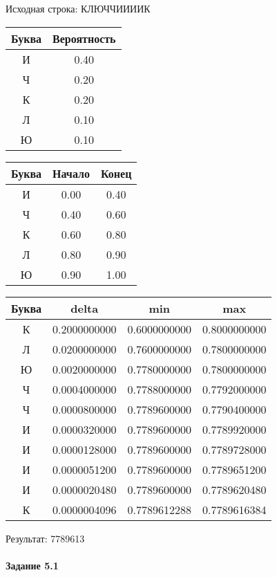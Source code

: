 \documentclass[a4paper, 12pt]{article}
\begin{document}
Исходная строка: КЛЮЧЧИИИИК\
\begin{center}
 \begin{tabular}{ |c|c| } 
  \hline
     Буква & Вероятность \\ \hline
И & 0.40\\\hline
Ч & 0.20\\\hline
К & 0.20\\\hline
Л & 0.10\\\hline
Ю & 0.10
\\ \hline \end{tabular}
\end{center}
\begin{center}
 \begin{tabular}{ |c|c|c| } 
  \hline
     Буква & Начало & Конец \\ \hline
И & 0.00 & 0.40\\\hline
Ч & 0.40 & 0.60\\\hline
К & 0.60 & 0.80\\\hline
Л & 0.80 & 0.90\\\hline
Ю & 0.90 & 1.00
\\ \hline \end{tabular}
\end{center}
\begin{center}
 \begin{tabular}{ |c|c|c|c| } 
  \hline
     Буква & delta & min & max \\ \hline
К & 0.2000000000 & 0.6000000000 & 0.8000000000\\\hline
Л & 0.0200000000 & 0.7600000000 & 0.7800000000\\\hline
Ю & 0.0020000000 & 0.7780000000 & 0.7800000000\\\hline
Ч & 0.0004000000 & 0.7788000000 & 0.7792000000\\\hline
Ч & 0.0000800000 & 0.7789600000 & 0.7790400000\\\hline
И & 0.0000320000 & 0.7789600000 & 0.7789920000\\\hline
И & 0.0000128000 & 0.7789600000 & 0.7789728000\\\hline
И & 0.0000051200 & 0.7789600000 & 0.7789651200\\\hline
И & 0.0000020480 & 0.7789600000 & 0.7789620480\\\hline
К & 0.0000004096 & 0.7789612288 & 0.7789616384
\\ \hline \end{tabular}
\end{center}
Результат: 7789613
\pagebreak
\paragraph{Задание 5.1}
\end{document}
